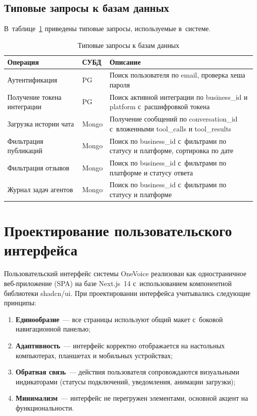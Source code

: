 \subsection{Типовые запросы к базам данных}
\label{subsec:db-queries}

В~таблице~\ref{tab:queries} приведены типовые запросы, используемые в~системе.

\begin{table}[H]
  \caption{Типовые запросы к базам данных}
  \label{tab:queries}
  \small
  \begin{tabularx}{\textwidth}{|p{3.5cm}|p{1.5cm}|X|}
    \hline
    \textbf{Операция} & \textbf{СУБД} & \textbf{Описание} \\
    \hline
    Аутентификация & PG & Поиск пользователя по email, проверка хеша пароля \\
    \hline
    Получение токена интеграции & PG & Поиск активной интеграции по business\_id и platform с~расшифровкой токена \\
    \hline
    Загрузка истории чата & Mongo & Получение сообщений по conversation\_id с~вложенными tool\_calls и tool\_results \\
    \hline
    Фильтрация публикаций & Mongo & Поиск по business\_id с~фильтрами по статусу и платформе, сортировка по дате \\
    \hline
    Фильтрация отзывов & Mongo & Поиск по business\_id с~фильтрами по платформе и статусу ответа \\
    \hline
    Журнал задач агентов & Mongo & Поиск по business\_id с~фильтрами по статусу и платформе \\
    \hline
  \end{tabularx}
\end{table}


\section{Проектирование пользовательского интерфейса}
\label{sec:ui-design}

Пользовательский интерфейс системы OneVoice реализован как одностраничное веб-приложение (SPA) на базе Next.js~14 с~использованием компонентной библиотеки shadcn/ui. При проектировании интерфейса учитывались следующие принципы:

\begin{enumerate}
  \item \textbf{Единообразие}~--- все страницы используют общий макет с~боковой навигационной панелью;
  \item \textbf{Адаптивность}~--- интерфейс корректно отображается на настольных компьютерах, планшетах и мобильных устройствах;
  \item \textbf{Обратная связь}~--- действия пользователя сопровождаются визуальными индикаторами (статусы подключений, уведомления, анимации загрузки);
  \item \textbf{Минимализм}~--- интерфейс не перегружен элементами, основной акцент на функциональности.
\end{enumerate}

